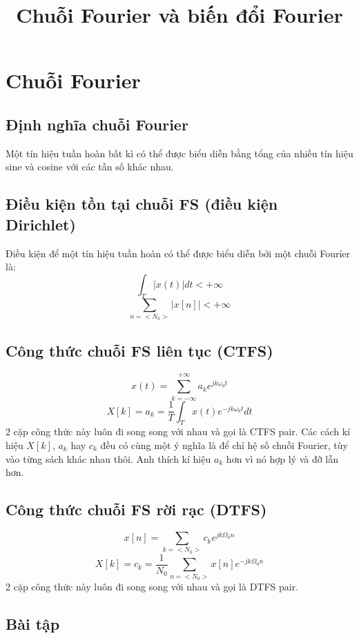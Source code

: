 \documentclass{article}
\title{Chuỗi Fourier và biến đổi Fourier}
\begin{document}
\maketitle
\section{Chuỗi Fourier}
\subsection{Định nghĩa chuỗi Fourier}
Một tín hiệu tuần hoàn bất kì có thể được biểu diễn bằng tổng của nhiều tín hiệu sine và cosine với các tần số khác nhau.
\subsection{Điều kiện tồn tại chuỗi FS (điều kiện Dirichlet)}
Điều kiện để một tín hiệu tuần hoàn có thể được biểu diễn bởi một chuỗi Fourỉer là:
\begin{equation*}
    \int_{T}|x(t)|dt < +\infty
\end{equation*}
\begin{equation*}
    \sum_{n=<N_{0}>}|x[n]|<+\infty
\end{equation*}
\subsection{Công thức chuỗi FS liên tục (CTFS)}
\begin{equation*}
    x(t)=\sum_{k=-\infty}^{+\infty}a_{k}e^{jk\omega_{0} t}
\end{equation*}
\begin{equation*}
    X[k] = a_{k}=\frac{1}{T}\int_{T}x(t)e^{-jk\omega_{0} t}dt
\end{equation*}
2 cặp công thức này luôn đi song song với nhau và gọi là CTFS pair. Các cách kí hiệu $X[k]$, $a_{k}$ hay $c_{k}$ đều có cùng một ý nghĩa là để chỉ hệ số chuỗi Fourier, tùy vào từng sách khác nhau thôi. Anh thích kí hiệu $a_{k}$ hơn vì nó hợp lý và đỡ lẫn hơn.
\subsection{Công thức chuỗi FS rời rạc (DTFS)}
$$x[n]=\sum_{k=<N_{0}>}c_{k}e^{jk\Omega_{0}n}$$
$$X[k]=c_{k}=\frac{1}{N_{0}}\sum_{n=<N_{0}>}x[n]e^{-jk\Omega_{0}n}$$
2 cặp công thức này luôn đi song song với nhau và gọi là DTFS pair.
\subsection{Bài tập}
\end{document}
